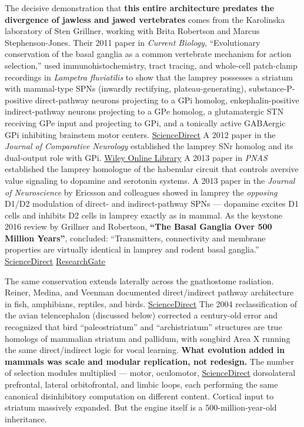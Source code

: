 The decisive demonstration that \textbf{this entire architecture predates the divergence of jawless and jawed vertebrates} comes from the Karolinska laboratory of Sten Grillner, working with Brita Robertson and Marcus Stephenson-Jones. Their 2011 paper in \emph{Current Biology}, ``Evolutionary conservation of the basal ganglia as a common vertebrate mechanism for action selection,'' used immunohistochemistry, tract tracing, and whole-cell patch-clamp recordings in \emph{Lampetra fluviatilis} to show that the lamprey possesses a striatum with mammal-type SPNs (inwardly rectifying, plateau-generating), substance-P-positive direct-pathway neurons projecting to a GPi homolog, enkephalin-positive indirect-pathway neurons projecting to a GPe homolog, a glutamatergic STN receiving GPe input and projecting to GPi, and a tonically active GABAergic GPi inhibiting brainstem motor centers. \href{https://www.sciencedirect.com/science/article/pii/S0960982214012998}{ScienceDirect} A 2012 paper in the \emph{Journal of Comparative Neurology} established the lamprey SNr homolog and its dual-output role with GPi. \href{https://onlinelibrary.wiley.com/doi/abs/10.1002/cne.23087}{Wiley Online Library} A 2013 paper in \emph{PNAS} established the lamprey homologue of the habenular circuit that controls aversive value signaling to dopamine and serotonin systems. A 2013 paper in the \emph{Journal of Neuroscience} by Ericsson and colleagues showed in lamprey the \emph{opposing} D1/D2 modulation of direct- and indirect-pathway SPNs --- dopamine excites D1 cells and inhibits D2 cells in lamprey exactly as in mammal. As the keystone 2016 review by Grillner and Robertson, \textbf{``The Basal Ganglia Over 500 Million Years''}, concluded: ``Transmitters, connectivity and membrane properties are virtually identical in lamprey and rodent basal ganglia.'' \href{https://www.sciencedirect.com/science/article/pii/S0960982216306807}{ScienceDirect} \href{https://www.researchgate.net/publication/228035209_Anatomy_of_the_Corpus_Striatum_and_Brain_Stem_Integrating_Systems}{ResearchGate}

The same conservation extends laterally across the gnathostome radiation. Reiner, Medina, and Veenman documented direct/indirect pathway architecture in fish, amphibians, reptiles, and birds. \href{https://www.sciencedirect.com/science/article/abs/pii/S0165017398000162}{ScienceDirect} The 2004 reclassification of the avian telencephalon (discussed below) corrected a century-old error and recognized that bird ``paleostriatum'' and ``archistriatum'' structures are true homologs of mammalian striatum and pallidum, with songbird Area X running the same direct/indirect logic for vocal learning. \textbf{What evolution added in mammals was scale and modular replication, not redesign.} The number of selection modules multiplied --- motor, oculomotor, \href{https://www.sciencedirect.com/science/article/pii/S0960982216306807}{ScienceDirect} dorsolateral prefrontal, lateral orbitofrontal, and limbic loops, each performing the same canonical disinhibitory computation on different content. Cortical input to striatum massively expanded. But the engine itself is a 500-million-year-old inheritance.

